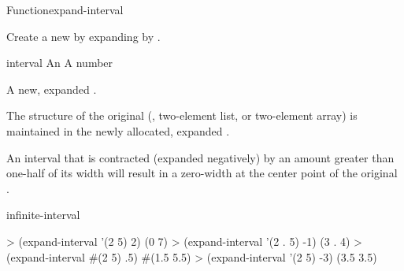 \documentclass[10pt,twoside,english,pdftex]{article}
\begin{document}
\begin{functiondoc}{Function}{expand-interval}%
  {
    \returns{} }
%
%

\fnsyntax

\fnpurpose Create a new  by expanding  by
.

\fnpackage {}

\fnmodule {}

\fnargs
\begin{args}{interval}
\arg[interval] An 
\arg[amount] A number
\end{args}

\fnreturns A new, expanded .

\fndescription The structure of the original 
(, two-element list, or two-element array) is maintained in the
newly allocated, expanded .

An interval that is contracted (expanded negatively) by an amount greater than
one-half of its width will result in a zero-width  at the
center point of the original .

\begin{alsos}{infinite-interval}
\end{alsos}

\fnexamples
%
\W\supp
\begin{example}
> (expand-interval '(2 5) 2)
(0 7)
> (expand-interval '(2 . 5) -1)
(3 . 4)\goodpagebreak
> (expand-interval #(2 5) .5)
#(1.5 5.5)
> (expand-interval '(2 5) -3)
(3.5 3.5)
\end{example}

\end{functiondoc}

\end{document}
